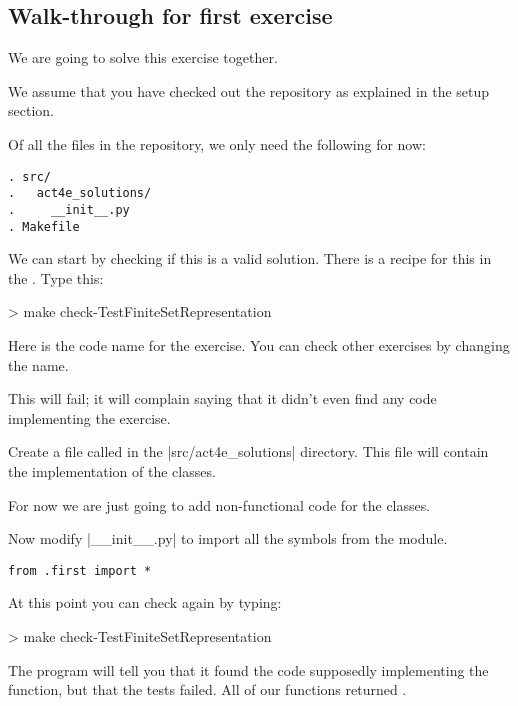 \subsection{Walk-through for first exercise}

We are going to solve this exercise together.

We assume that you have checked out the repository as explained in the setup section.

Of all the files in the repository, we only need the following for now:

\begin{verbatim}
. src/
.   act4e_solutions/
.     __init__.py
. Makefile
\end{verbatim}


We can start by checking if this is a valid solution. There is a recipe for this in the .
Type this:

\begin{console}
  > make check-TestFiniteSetRepresentation
\end{console}

Here  is the code name for the exercise. You can check other exercises by changing the name.

This will fail; it will complain saying that it didn't even find any code implementing the exercise.


Create a file called  in the \files|src/act4e_solutions| directory.
This file will contain the implementation of the classes.

For now we are just going to add non-functional code for the classes.


Now modify \files|__init__.py| to import all the symbols from the  module.

\begin{verbatim}
from .first import *
\end{verbatim}

At this point you can check again by typing:

\begin{console}
  > make check-TestFiniteSetRepresentation
\end{console}

The program will tell you that it found the code supposedly implementing the function,
but that the tests failed. All of our functions returned .

